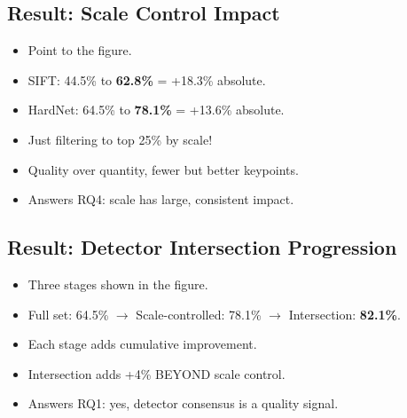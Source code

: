\documentclass[11pt, letterpaper]{article}
\begin{document}
\subsection{Result: Scale Control Impact}
\begin{itemize}
  \item Point to the figure.
  \item SIFT: 44.5\% to \textbf{62.8\%} = +18.3\% absolute.
  \item HardNet: 64.5\% to \textbf{78.1\%} = +13.6\% absolute.
  \item Just filtering to top 25\% by scale!
  \item Quality over quantity, fewer but better keypoints.
  \item Answers RQ4: scale has large, consistent impact.
\end{itemize}

\subsection{Result: Detector Intersection Progression}
\begin{itemize}
  \item Three stages shown in the figure.
  \item Full set: 64.5\% $\to$ Scale-controlled: 78.1\% $\to$ Intersection: \textbf{82.1\%}.
  \item Each stage adds cumulative improvement.
  \item Intersection adds +4\% BEYOND scale control.
  \item Answers RQ1: yes, detector consensus is a quality signal.
\end{itemize}

\end{document}

